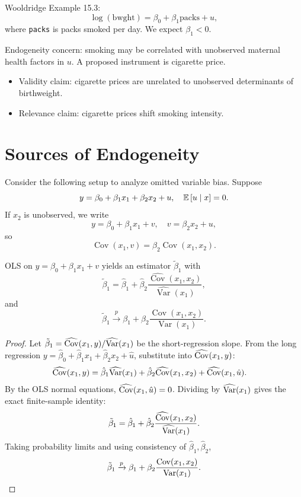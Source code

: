 \begin{example}
	Wooldridge Example 15.3: \[
		\log(\text{bwght}) = \beta_0 + \beta_1\text{packs} + u
	,\]
	where \texttt{packs} is packs smoked per day. We expect $\beta_1<0$.

	Endogeneity concern: smoking may be correlated with unobserved maternal health factors in $u$. A proposed instrument is cigarette price.
	\begin{itemize}
		\item Validity claim: cigarette prices are unrelated to unobserved determinants of birthweight.
		\item Relevance claim: cigarette prices shift smoking intensity.
	\end{itemize}
\end{example}

\section{Sources of Endogeneity}

Consider the following setup to analyze omitted variable bias.
Suppose \[
	y = \beta_0 + \beta_1 x_1 + \beta_2 x_2 + u, \quad \mathbb{E}\left[u \mid x\right]=0
.\]
If $x_2$ is unobserved, we write \[
	y = \beta_0 + \beta_1 x_1 + v, \quad v=\beta_2 x_2 + u
,\]
so \[
	\operatorname{Cov}(x_1,v)=\beta_2\operatorname{Cov}(x_1,x_2)
.\]

\begin{proposition}
	OLS on $y=\beta_0+\beta_1 x_1+v$ yields an estimator $\tilde{\beta}_1$ with \[
		\tilde{\beta}_1 = \hat{\beta}_1 + \hat{\beta}_2\frac{\widehat{\operatorname{Cov}}(x_1,x_2)}{\widehat{\operatorname{Var}}(x_1)}
	,\]
	and \[
		\tilde{\beta}_1 \xrightarrow{p} \beta_1 + \beta_2\frac{\operatorname{Cov}(x_1,x_2)}{\operatorname{Var}(x_1)}
	.\]
\end{proposition}

\begin{proof}
	Let $\tilde{\beta}_1 = \widehat{\operatorname{Cov}}(x_1,y)/\widehat{\operatorname{Var}}(x_1)$ be the short-regression slope. From the long regression $y = \hat{\beta}_0 + \hat{\beta}_1 x_1 + \hat{\beta}_2 x_2 + \hat{u}$, substitute into $\widehat{\operatorname{Cov}}(x_1,y)$:
	\begin{align*}
		\widehat{\operatorname{Cov}}(x_1,y)
		&= \hat{\beta}_1\widehat{\operatorname{Var}}(x_1) + \hat{\beta}_2\widehat{\operatorname{Cov}}(x_1,x_2) + \widehat{\operatorname{Cov}}(x_1,\hat{u})
	.\end{align*}
	By the OLS normal equations, $\widehat{\operatorname{Cov}}(x_1,\hat{u})=0$. Dividing by $\widehat{\operatorname{Var}}(x_1)$ gives the exact finite-sample identity:
	\[
		\tilde{\beta}_1 = \hat{\beta}_1 + \hat{\beta}_2\frac{\widehat{\operatorname{Cov}}(x_1,x_2)}{\widehat{\operatorname{Var}}(x_1)}
	.\]
	Taking probability limits and using consistency of $\hat{\beta}_1,\hat{\beta}_2$,
	\[
		\tilde{\beta}_1 \xrightarrow{p} \beta_1 + \beta_2\frac{\operatorname{Cov}(x_1,x_2)}{\operatorname{Var}(x_1)}
	.\]
\end{proof}


